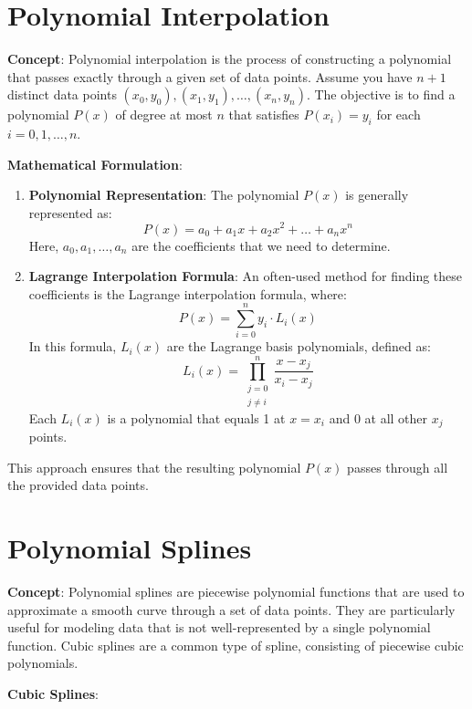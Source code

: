 \documentclass{article}
\begin{document}
\section*{Polynomial Interpolation}

\textbf{Concept}: Polynomial interpolation is the process of constructing a polynomial that passes exactly through a given set of data points. Assume you have \( n + 1 \) distinct data points \( (x_0, y_0), (x_1, y_1), \ldots, (x_n, y_n) \). The objective is to find a polynomial \( P(x) \) of degree at most \( n \) that satisfies \( P(x_i) = y_i \) for each \( i = 0, 1, \ldots, n \).

\textbf{Mathematical Formulation}:

\begin{enumerate}
    \item \textbf{Polynomial Representation}:
    The polynomial \( P(x) \) is generally represented as:
    \[
    P(x) = a_0 + a_1 x + a_2 x^2 + \ldots + a_n x^n
    \]
    Here, \( a_0, a_1, \ldots, a_n \) are the coefficients that we need to determine.

    \item \textbf{Lagrange Interpolation Formula}:
    An often-used method for finding these coefficients is the Lagrange interpolation formula, where:
    \[
    P(x) = \sum_{i=0}^{n} y_i \cdot L_i(x)
    \]
    In this formula, \( L_i(x) \) are the Lagrange basis polynomials, defined as:
    \[
    L_i(x) = \prod_{\substack{j=0 \\ j \neq i}}^{n} \frac{x - x_j}{x_i - x_j}
    \]
    Each \( L_i(x) \) is a polynomial that equals 1 at \( x = x_i \) and 0 at all other \( x_j \) points.
\end{enumerate}

This approach ensures that the resulting polynomial \( P(x) \) passes through all the provided data points.

\section*{Polynomial Splines}

\textbf{Concept}: Polynomial splines are piecewise polynomial functions that are used to approximate a smooth curve through a set of data points. They are particularly useful for modeling data that is not well-represented by a single polynomial function. Cubic splines are a common type of spline, consisting of piecewise cubic polynomials.

\textbf{Cubic Splines}:
\end{document}
